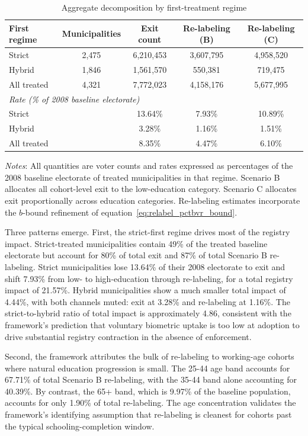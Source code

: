 \begin{table}[!ht]
\centering
\caption{Aggregate decomposition by first-treatment regime}
\label{tab:decomp_aggregate}
\begin{tabular}{lcccc}
\toprule
First regime & Municipalities & Exit count & Re-labeling (B) & Re-labeling (C) \\
\midrule
Strict & 2{,}475 & 6{,}210{,}453 & 3{,}607{,}795 & 4{,}958{,}520 \\
Hybrid & 1{,}846 & 1{,}561{,}570 & 550{,}381 & 719{,}475 \\
\midrule
All treated & 4{,}321 & 7{,}772{,}023 & 4{,}158{,}176 & 5{,}677{,}995 \\
\midrule
\multicolumn{5}{l}{\textit{Rate (\% of 2008 baseline electorate)}} \\
\quad Strict & & 13.64\% & 7.93\% & 10.89\% \\
\quad Hybrid & & 3.28\% & 1.16\% & 1.51\% \\
\quad All treated & & 8.35\% & 4.47\% & 6.10\% \\
\bottomrule
\end{tabular}

\medskip
\footnotesize
\textit{Notes}: All quantities are voter counts and rates expressed as percentages of the 2008 baseline electorate of treated municipalities in that regime. Scenario B allocates all cohort-level exit to the low-education category. Scenario C allocates exit proportionally across education categories. Re-labeling estimates incorporate the $b$-bound refinement of equation~\eqref{eq:relabel_pctbvr_bound}.
\end{table}

Three patterns emerge. First, the strict-first regime drives most of the registry impact. Strict-treated municipalities contain 49\% of the treated baseline electorate but account for 80\% of total exit and 87\% of total Scenario B re-labeling. Strict municipalities lose 13.64\% of their 2008 electorate to exit and shift 7.93\% from low- to high-education through re-labeling, for a total registry impact of 21.57\%. Hybrid municipalities show a much smaller total impact of 4.44\%, with both channels muted: exit at 3.28\% and re-labeling at 1.16\%. The strict-to-hybrid ratio of total impact is approximately 4.86, consistent with the framework's prediction that voluntary biometric uptake is too low at adoption to drive substantial registry contraction in the absence of enforcement.

Second, the framework attributes the bulk of re-labeling to working-age cohorts where natural education progression is small. The 25-44 age band accounts for 67.71\% of total Scenario B re-labeling, with the 35-44 band alone accounting for 40.39\%. By contrast, the 65+ band, which is 9.97\% of the baseline population, accounts for only 1.90\% of total re-labeling. The age concentration validates the framework's identifying assumption that re-labeling is cleanest for cohorts past the typical schooling-completion window.

